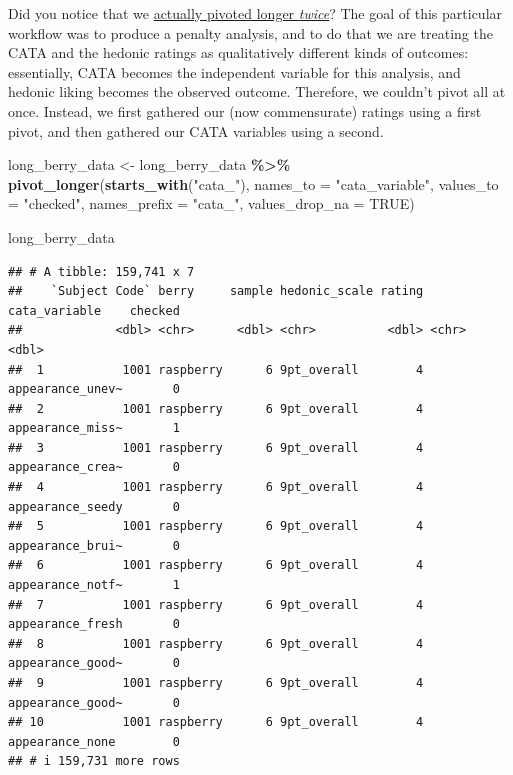 \documentclass[
]{book}
\newenvironment{Shaded}{\begin{snugshade}}{\end{snugshade}}
\newcommand{\AttributeTok}[1]{\textcolor[rgb]{0.13,0.29,0.53}{#1}}
\newcommand{\ConstantTok}[1]{\textcolor[rgb]{0.56,0.35,0.01}{#1}}
\newcommand{\FunctionTok}[1]{\textcolor[rgb]{0.13,0.29,0.53}{\textbf{#1}}}
\newcommand{\NormalTok}[1]{#1}
\newcommand{\OtherTok}[1]{\textcolor[rgb]{0.56,0.35,0.01}{#1}}
\newcommand{\SpecialCharTok}[1]{\textcolor[rgb]{0.81,0.36,0.00}{\textbf{#1}}}
\newcommand{\StringTok}[1]{\textcolor[rgb]{0.31,0.60,0.02}{#1}}
\begin{document}
Did you notice that we \protect\hyperlink{berries}{actually pivoted longer \emph{twice}}? The goal of this particular workflow was to produce a penalty analysis, and to do that we are treating the CATA and the hedonic ratings as qualitatively different kinds of outcomes: essentially, CATA becomes the independent variable for this analysis, and hedonic liking becomes the observed outcome. Therefore, we couldn't pivot all at once. Instead, we first gathered our (now commensurate) ratings using a first pivot, and then gathered our CATA variables using a second.

\begin{Shaded}
\begin{Highlighting}[]
\NormalTok{long\_berry\_data }\OtherTok{\textless{}{-}} 
\NormalTok{  long\_berry\_data }\SpecialCharTok{\%\textgreater{}\%}
  \FunctionTok{pivot\_longer}\NormalTok{(}\FunctionTok{starts\_with}\NormalTok{(}\StringTok{"cata\_"}\NormalTok{),}
               \AttributeTok{names\_to =} \StringTok{"cata\_variable"}\NormalTok{,}
               \AttributeTok{values\_to =} \StringTok{"checked"}\NormalTok{,}
               \AttributeTok{names\_prefix =} \StringTok{"cata\_"}\NormalTok{,}
               \AttributeTok{values\_drop\_na =} \ConstantTok{TRUE}\NormalTok{)}

\NormalTok{long\_berry\_data}
\end{Highlighting}
\end{Shaded}

\begin{verbatim}
## # A tibble: 159,741 x 7
##    `Subject Code` berry     sample hedonic_scale rating cata_variable    checked
##             <dbl> <chr>      <dbl> <chr>          <dbl> <chr>              <dbl>
##  1           1001 raspberry      6 9pt_overall        4 appearance_unev~       0
##  2           1001 raspberry      6 9pt_overall        4 appearance_miss~       1
##  3           1001 raspberry      6 9pt_overall        4 appearance_crea~       0
##  4           1001 raspberry      6 9pt_overall        4 appearance_seedy       0
##  5           1001 raspberry      6 9pt_overall        4 appearance_brui~       0
##  6           1001 raspberry      6 9pt_overall        4 appearance_notf~       1
##  7           1001 raspberry      6 9pt_overall        4 appearance_fresh       0
##  8           1001 raspberry      6 9pt_overall        4 appearance_good~       0
##  9           1001 raspberry      6 9pt_overall        4 appearance_good~       0
## 10           1001 raspberry      6 9pt_overall        4 appearance_none        0
## # i 159,731 more rows
\end{verbatim}
\end{document}

